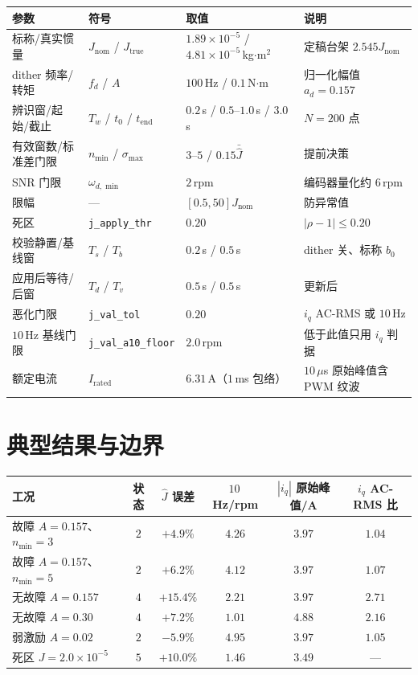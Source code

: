 \documentclass[11pt,a4paper]{article}
\newcommand{\Jnom}{J_{\mathrm{nom}}}
\newcommand{\Jtrue}{J_{\mathrm{true}}}
\newcommand{\Jhat}{\hat J}
\begin{document}
\begin{center}\footnotesize
\begin{tabular}{@{}llll@{}}
\toprule
参数 & 符号 & 取值 & 说明\\
\midrule
标称/真实惯量 & $\Jnom$ / $\Jtrue$ & $1.89\times10^{-5}$ / $4.81\times10^{-5}$\,kg$\cdot$m$^2$ & 定稿台架 $2.545\Jnom$\\
dither 频率/转矩 & $f_d$ / $A$ & $100$\,Hz / $0.1$\,N$\cdot$m & 归一化幅值 $a_d=0.157$\\
辨识窗/起始/截止 & $T_w$ / $t_0$ / $t_{\mathrm{end}}$ & $0.2$\,s / $0.5$--$1.0$\,s / $3.0$\,s & $N=200$ 点\\
有效窗数/标准差门限 & $n_{\min}$ / $\sigma_{\max}$ & $3$--$5$ / $0.15\bar{\Jhat}$ & 提前决策\\
SNR 门限 & $\omega_{d,\min}$ & $2$\,rpm & 编码器量化约 $6$\,rpm\\
限幅 & — & $[0.5,50]\Jnom$ & 防异常值\\
死区 & \texttt{j\_apply\_thr} & $0.20$ & $|\rho-1|\le0.20$\\
校验静置/基线窗 & $T_s$ / $T_b$ & $0.2$\,s / $0.5$\,s & dither 关、标称 $b_0$\\
应用后等待/后窗 & $T_d$ / $T_v$ & $0.5$\,s / $0.5$\,s & 更新后\\
恶化门限 & \texttt{j\_val\_tol} & $0.20$ & $i_q$ AC-RMS 或 $10$\,Hz\\
$10$\,Hz 基线门限 & \texttt{j\_val\_a10\_floor} & $2.0$\,rpm & 低于此值只用 $i_q$ 判据\\
额定电流 & $I_{\mathrm{rated}}$ & $6.31$\,A（$1$\,ms 包络） & $10$\,$\mu$s 原始峰值含 PWM 纹波\\
\bottomrule
\end{tabular}
\end{center}

\section{典型结果与边界}

\begin{center}\footnotesize
\begin{tabular}{@{}lccccc@{}}
\toprule
工况 & 状态 & $\Jhat$ 误差 & $10$\,Hz/rpm & $|i_q|$ 原始峰值/A & $i_q$ AC-RMS 比\\
\midrule
故障 $A=0.157$、$n_{\min}=3$ & $2$ & $+4.9\%$ & $4.26$ & $3.97$ & $1.04$\\
故障 $A=0.157$、$n_{\min}=5$ & $2$ & $+6.2\%$ & $4.12$ & $3.97$ & $1.07$\\
无故障 $A=0.157$ & $4$ & $+15.4\%$ & $2.21$ & $3.97$ & $2.71$\\
无故障 $A=0.30$ & $4$ & $+7.2\%$ & $1.01$ & $4.88$ & $2.16$\\
弱激励 $A=0.02$ & $2$ & $-5.9\%$ & $4.95$ & $3.97$ & $1.05$\\
死区 $J=2.0\times10^{-5}$ & $5$ & $+10.0\%$ & $1.46$ & $3.49$ & ---\\
\bottomrule
\end{tabular}
\end{center}
\end{document}
